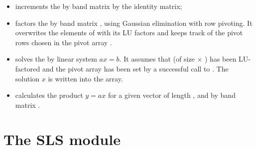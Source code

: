 \begin{itemize}
\item {}
  \par {} increments the  by  band matrix  by the
  identity matrix;

\item {}
  \par {} factors the  by  band matrix ,
  using Gaussian elimination with row pivoting. 
  It overwrites the elements of  with its LU factors and keeps track of the
  pivot rows chosen in the pivot array .

\item {}
  \par {} solves the  by  linear system $ax = b$. 
  It assumes that  (of size  $\times$ ) has been LU-factored 
  and the pivot array  has been set by a successful call to 
  . The solution $x$ is written into the  array.

\item {}
  \par {} calculates the product $y = ax$ for a given vector
   of length , and  by  band matrix .

\end{itemize}







\section{The SLS module}\label{s:sls}

